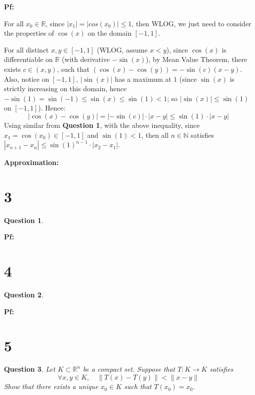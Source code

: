 \documentclass{article}
\newtheorem{question}{Question}
\begin{document}
\textbf{Pf:}

For all $x_0\in\mathbb{R}$, since $|x_1|=|cos(x_0)|\leq 1$, then WLOG, we just need to consider the properties of $\cos(x)$ on the domain $[-1,1]$.

For all distinct $x,y\in[-1,1]$ (WLOG, assume $x<y$), since $\cos(x)$ is differentiable on $\mathbb{R}$ (with derivative $-\sin(x)$), by Mean Value Theorem, 
there exists $c\in (x,y)$, such that $(\cos(x)-\cos(y))=-\sin(c)(x-y)$. Also, notice on $[-1,1]$, $|\sin(x)|$ has a maximum at $1$ 
(since $\sin(x)$ is strictly increasing on this domain, hence $-\sin(1)=\sin(-1)\leq \sin(x)\leq \sin(1) < 1$; so $|\sin(x)|\leq \sin(1)$ on $[-1,1]$). Hence:
$$|\cos(x)-\cos(y)|=|-\sin(c)|\cdot|x-y| \leq \sin(1)\cdot|x-y|$$
Using similar
 from \textbf{Question 1}, with the above inequality, since $x_1=\cos(x_0)\in[-1,1]$ and $\sin(1)<1$, 
then all $n\in\mathbb{N}$ satisfies $|x_{n+1}-x_n|\leq \sin(1)^{n-1}\cdot |x_2-x_1|$.


\hfil

\textbf{Approximation:}


\break

\section*{3}
\begin{myBox}[]{}
    \begin{question}
        
    \end{question}
\end{myBox}

\textbf{Pf:}

\break

\section*{4}
\begin{myBox}[]{}
    \begin{question}
        
    \end{question}
\end{myBox}

\textbf{Pf:}

\break

\section*{5}
\begin{myBox}[]{}
    \begin{question}
        Let $K\subset \mathbb{R}^n$ be a compact set. Suppose that $T:K\rightarrow K$ satisfies
        $$\forall x,y\in K,\quad \|T(x)-T(y)\|<\|x-y\|$$
        Show that there exists a unique $x_0\in K$ such that $T(x_0)=x_0$.
    \end{question}
\end{myBox}
\end{document}
